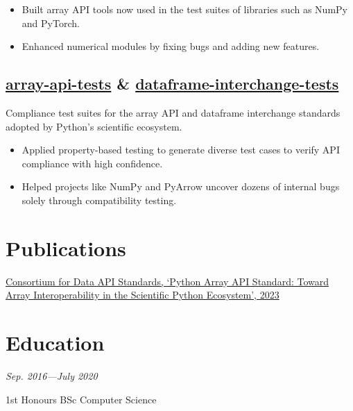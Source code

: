\documentclass[11pt]{article}
\newcommand{\datedsubsection}[2]{{\large\subsectionfont{#1}} \hfill {\scriptsize\textit{#2}}}
\newcommand{\listhighlights}[1]{
	\begin{itemize}[topsep=2pt, partopsep=0pt, itemsep=2pt, parsep=0pt, leftmargin=12pt]
		#1
	\end{itemize}
}
\begin{document}
\listhighlights{
	\item Built array API tools now used in the test suites of libraries such as NumPy and PyTorch.
	\item Enhanced numerical modules by fixing bugs and adding new features.
}

\subsection*{\href{https://github.com/data-apis/array-api-tests/}{array-api-tests} \& \href{https://github.com/data-apis/dataframe-interchange-tests/}{dataframe-interchange-tests}}

Compliance test suites for the array API and dataframe interchange standards adopted by Python's scientific ecosystem.

\listhighlights{
	\item Applied property-based testing to generate diverse test cases to verify API compliance with high confidence.
	\item Helped projects like NumPy and PyArrow uncover dozens of internal bugs solely through compatibility testing.
}

\section*{Publications}

\href{https://proceedings.scipy.org/articles/gerudo-f2bc6f59-001}{Consortium for Data API Standards, `Python Array API Standard: Toward Array Interoperability in the Scientific Python Ecosystem', 2023}

\section*{Education}

\datedsubsection{Aston University}{Sep. 2016—July 2020}

1st Honours BSc Computer Science
\end{document}
